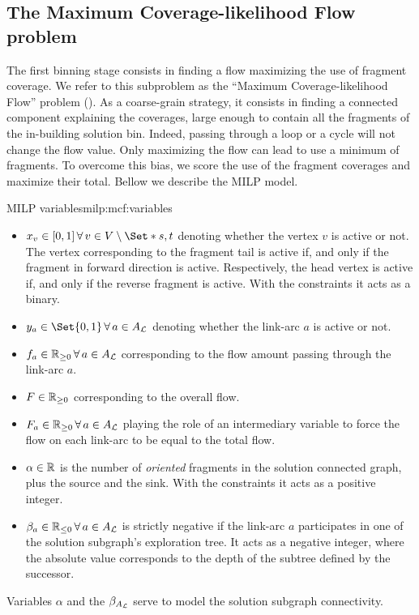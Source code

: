 \subsection{The Maximum Coverage-likelihood Flow problem \MCF{}}\label{sec:method:mcf}

The first binning stage consists in finding a flow maximizing the use of fragment coverage.
We refer to this subproblem as the \enquote{Maximum Coverage-likelihood Flow} problem (\MCF{}).
As a coarse-grain strategy, it consists in finding a connected component explaining the coverages, large enough to contain all the fragments of the in-building solution bin.
Indeed, passing through a loop or a cycle will not change the flow value. Only maximizing the flow can lead to use a minimum of fragments.
To overcome this bias, we score the use of the fragment coverages and maximize their total.
Bellow we describe the MILP model.

\begin{definition}{\MCF{} MILP variables}{milp:mcf:variables}
  \begin{itemize}
    \item \(x_v \in [0, 1] \, \forall v \in V \setminus \Set*{s, t}\) denoting whether the vertex \(v\) is active or not.
      The vertex corresponding to the fragment tail is active if, and only if the fragment in forward direction is active. Respectively, the head vertex is active if, and only if the reverse fragment is active. With the constraints it acts as a binary.
    \item \(y_a \in \Set{0, 1} \, \forall a \in A_\Links{}\) denoting whether the link-arc \(a\) is active or not.
    \item \(f_a \in \Reals_{\geq 0} \, \forall a \in A_\Links{}\) corresponding to the flow amount passing through the link-arc \(a\).
    \item \(F \in \mathbb{R}_{\geq 0}\) corresponding to the overall flow.
    \item \(F_a \in \Reals_{\geq 0} \, \forall a \in A_\Links{}\) playing the role of an intermediary variable to force the flow on each link-arc to be equal to the total flow.
    \item \(\alpha \in \mathbb{R}{}\) is the number of \emph{oriented} fragments in the solution connected graph, plus the source and the sink. With the constraints it acts as a positive integer.
    \item \(\beta_a \in \Reals_{\leq 0} \, \forall a \in A_\Links{}\) is strictly negative if the link-arc \(a\) participates in one of the solution subgraph's exploration tree.
      It acts as a negative integer, where the absolute value corresponds to the depth of the subtree defined by the successor.
  \end{itemize}
  Variables \(\alpha{}\) and the \(\beta_{A_{\mathcal{L}}{}}\) serve to model the solution subgraph connectivity.
\end{definition}

